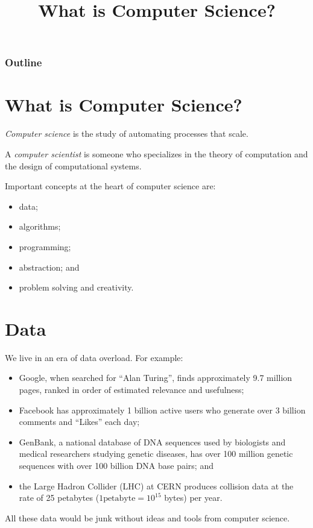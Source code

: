\documentclass[8pt,a4paper,compress,handout]{beamer}
\title{What is Computer Science?}
\date{}
\begin{document}
\begin{frame}
\vfill
\titlepage
\end{frame}

\begin{frame}
\frametitle{Outline}
\tableofcontents
\end{frame}

\section{What is Computer Science?}
\begin{frame}[fragile]
\emph{Computer science} is the study of automating processes that scale. 

\bigskip

A \emph{computer scientist} is someone who specializes in the theory of computation and the design of computational systems.

\bigskip

Important concepts at the heart of computer science are: 
\begin{itemize}
\item data;  
\item algorithms; 
\item programming; 
\item abstraction; and 
\item problem solving and creativity.
\end{itemize}
\end{frame}

\section{Data}
\begin{frame}[fragile]

We live in an era of data overload. For example:
\begin{itemize}
\item Google, when searched for ``Alan Turing'', finds approximately 9.7 million pages, ranked in order of estimated relevance and usefulness; 
\item Facebook has approximately 1 billion active users who generate over 3 billion comments and ``Likes'' each day; 
\item GenBank, a national database of DNA sequences used by biologists and medical researchers studying genetic diseases, has over 100 million genetic sequences with over 100 billion DNA base pairs; and 
\item the Large Hadron Collider (LHC) at CERN produces collision data at the rate of 25 petabytes ($1 \text{petabyte} = 10^{15}$ bytes) per year.
\end{itemize}

\bigskip

All these data would be junk without ideas and tools from computer science.
\end{frame}
\end{document}
